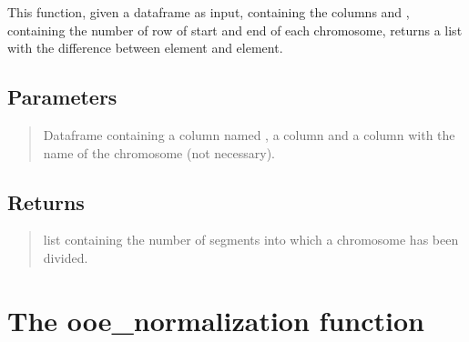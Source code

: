\documentclass[letterpaper,10pt,english]{sphinxmanual}
\begin{document}
\begin{fulllineitems}
\label{\detokenize{index:hicanalysis.preprocessing.get_chromosome_list}}
\pysigstartsignatures
{}
\pysigstopsignatures
\sphinxAtStartPar
This function, given a dataframe as input, containing the columns  and , containing the 
number of row of start and end of each chromosome, returns a list with the difference between 
 element and  element.


\subsection{Parameters}
\label{\detokenize{index:id5}}\begin{quote}
\begin{description}
\sphinxAtStartPar
Dataframe containing a column named , a column  and a 
column with the name of the chromosome (not necessary).

\end{description}
\end{quote}


\subsection{Returns}
\label{\detokenize{index:id6}}\begin{quote}
\begin{description}
\sphinxAtStartPar
list containing the number of segments into which a chromosome has been divided.

\end{description}
\end{quote}

\end{fulllineitems}



\section{The ooe\_normalization function}
\label{\detokenize{index:the-ooe-normalization-function}}
\end{document}
